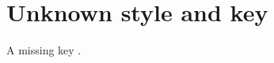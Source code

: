 \documentclass{article}
\begin{document}
\section*{Unknown style and key}

A missing key \cite{nosuchkey}.


\end{document}
